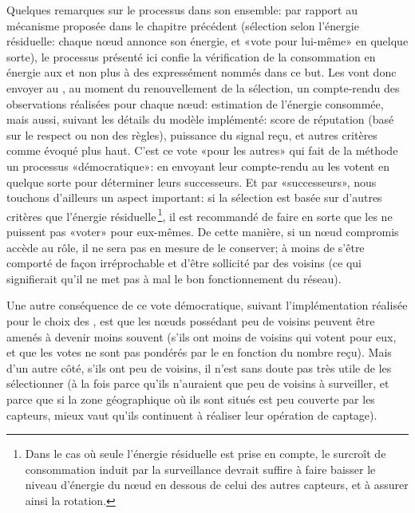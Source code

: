 Quelques remarques sur le processus dans son ensemble: par rapport au mécanisme proposée dans le chapitre précédent (sélection selon l'énergie résiduelle: chaque nœud annonce son énergie, et «vote pour lui-même» en quelque sorte), le processus présenté ici confie la vérification de la consommation en énergie aux \cns et non plus à des \vns expressément nommés dans ce but.
Les \cns vont donc envoyer au \ch, au moment du renouvellement de la sélection, un compte-rendu des observations réalisées pour chaque nœud: estimation de l'énergie consommée, mais aussi, suivant les détails du modèle implémenté: score de réputation (basé sur le respect ou non des règles), puissance du signal reçu, et autres critères comme évoqué plus haut.
C'est ce vote «pour les autres» qui fait de la méthode un processus «démocratique»: en envoyant leur compte-rendu au \CH les \cns votent en quelque sorte pour déterminer leurs successeurs.
Et par «successeurs», nous touchons d'ailleurs un aspect important: si la sélection est basée sur d'autres critères que l'énergie résiduelle\,\footnote{Dans le cas où seule l'énergie résiduelle est prise en compte, le surcroît de consommation induit par la surveillance devrait suffire à faire baisser le niveau d'énergie du nœud en dessous de celui des autres capteurs, et à assurer ainsi la rotation.}, il est recommandé de faire en sorte que les \cns ne puissent pas «voter» pour eux-mêmes.
De cette manière, si un nœud compromis accède au rôle, il ne sera pas en mesure de le conserver; à moins de s'être comporté de façon irréprochable et d'être sollicité par des \cns voisins (ce qui signifierait qu'il ne met pas à mal le bon fonctionnement du réseau).

Une autre conséquence de ce vote démocratique, suivant l'implémentation réalisée pour le choix des \cns, est que les nœuds possédant peu de voisins peuvent être amenés à devenir moins souvent \cns (s'ils ont moins de \cns voisins qui votent pour eux, et que les votes ne sont pas pondérés par le \ch en fonction du nombre reçu).
Mais d'un autre côté, s'ils ont peu de voisins, il n'est sans doute pas très utile de les sélectionner (à la fois parce qu'ils n'auraient que peu de voisins à surveiller, et parce que si la zone géographique où ils sont situés est peu couverte par les capteurs, mieux vaut qu'ils continuent à réaliser leur opération de captage).
